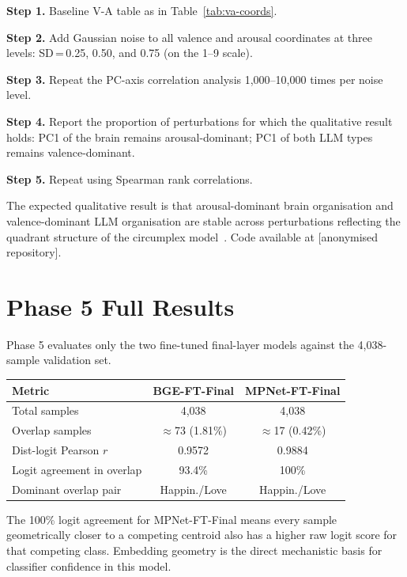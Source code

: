 \documentclass{article}
\begin{document}
\textbf{Step 1.} Baseline V-A table as in Table~\ref{tab:va-coords}.

\textbf{Step 2.} Add Gaussian noise to all valence and arousal coordinates at three
levels: SD\,=\,0.25, 0.50, and 0.75 (on the 1--9 scale).

\textbf{Step 3.} Repeat the PC-axis correlation analysis 1,000--10,000 times per noise
level.

\textbf{Step 4.} Report the proportion of perturbations for which the qualitative
result holds: PC1 of the brain remains arousal-dominant; PC1 of both LLM types remains
valence-dominant.

\textbf{Step 5.} Repeat using Spearman rank correlations.

The expected qualitative result is that arousal-dominant brain organisation and
valence-dominant LLM organisation are stable across perturbations reflecting the
quadrant structure of the circumplex model~\citep{posner2005}.
Code available at [anonymised repository].

\section{Phase 5 Full Results}
\label{app:phase5}

Phase 5 evaluates only the two fine-tuned final-layer models against the 4,038-sample
validation set.

\begin{center}
\small
\begin{tabular}{lcc}
\toprule
Metric & BGE-FT-Final & MPNet-FT-Final \\
\midrule
Total samples               & 4,038   & 4,038 \\
Overlap samples             & $\approx$73 (1.81\%) & $\approx$17 (0.42\%) \\
Dist-logit Pearson $r$      & 0.9572  & 0.9884 \\
Logit agreement in overlap  & 93.4\%  & 100\%  \\
Dominant overlap pair       & Happin./Love & Happin./Love \\
\bottomrule
\end{tabular}
\end{center}

The 100\% logit agreement for MPNet-FT-Final means every sample geometrically closer to
a competing centroid also has a higher raw logit score for that competing class.
Embedding geometry is the direct mechanistic basis for classifier confidence in this
model.
\end{document}
